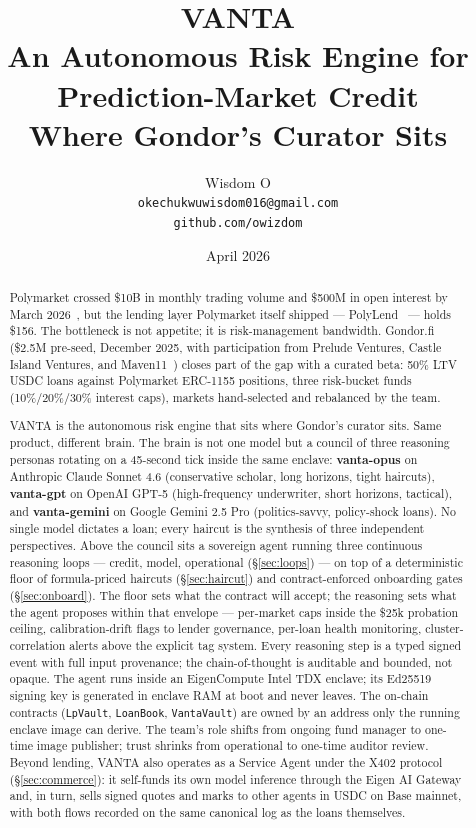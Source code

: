 \documentclass[11pt,letterpaper]{article}
\title{\vspace{-1.0cm}\textbf{\Large VANTA}\\[0.2cm]
\normalsize An Autonomous Risk Engine for Prediction-Market Credit\\
Where Gondor's Curator Sits}
\author{Wisdom O\\[0.12cm]
\small \texttt{okechukwuwisdom016@gmail.com}\\[0.02cm]
\small \texttt{github.com/owizdom}}
\date{April 2026}
\begin{document}
\maketitle
\vspace{-0.4cm}

\begin{abstract}
\noindent
Polymarket crossed \$10B in monthly trading volume and \$500M in open interest by March 2026~\cite{polymarket-volume,polymarket-oi}, but the lending layer Polymarket itself shipped --- PolyLend~\cite{polylend} --- holds \$156. The bottleneck is not appetite; it is risk-management bandwidth. Gondor.fi (\$2.5M pre-seed, December 2025, with participation from Prelude Ventures, Castle Island Ventures, and Maven11~\cite{gondor-seed}) closes part of the gap with a curated beta: 50\% LTV USDC loans against Polymarket ERC-1155 positions, three risk-bucket funds (10\%/20\%/30\% interest caps), markets hand-selected and rebalanced by the team.

VANTA is the autonomous risk engine that sits where Gondor's curator sits. Same product, different brain. The brain is not one model but a council of three reasoning personas rotating on a 45-second tick inside the same enclave: \textbf{vanta-opus} on Anthropic Claude Sonnet 4.6 (conservative scholar, long horizons, tight haircuts), \textbf{vanta-gpt} on OpenAI GPT-5 (high-frequency underwriter, short horizons, tactical), and \textbf{vanta-gemini} on Google Gemini 2.5 Pro (politics-savvy, policy-shock loans). No single model dictates a loan; every haircut is the synthesis of three independent perspectives. Above the council sits a sovereign agent running three continuous reasoning loops --- credit, model, operational (\S\ref{sec:loops}) --- on top of a deterministic floor of formula-priced haircuts (\S\ref{sec:haircut}) and contract-enforced onboarding gates (\S\ref{sec:onboard}). The floor sets what the contract will accept; the reasoning sets what the agent proposes within that envelope --- per-market caps inside the \$25k probation ceiling, calibration-drift flags to lender governance, per-loan health monitoring, cluster-correlation alerts above the explicit tag system. Every reasoning step is a typed signed event with full input provenance; the chain-of-thought is auditable and bounded, not opaque. The agent runs inside an EigenCompute Intel TDX enclave; its Ed25519 signing key is generated in enclave RAM at boot and never leaves. The on-chain contracts (\texttt{LpVault}, \texttt{LoanBook}, \texttt{VantaVault}) are owned by an address only the running enclave image can derive. The team's role shifts from ongoing fund manager to one-time image publisher; trust shrinks from operational to one-time auditor review. Beyond lending, VANTA also operates as a Service Agent under the X402 protocol (\S\ref{sec:commerce}): it self-funds its own model inference through the Eigen AI Gateway and, in turn, sells signed quotes and marks to other agents in USDC on Base mainnet, with both flows recorded on the same canonical log as the loans themselves.


\end{abstract}
\end{document}
